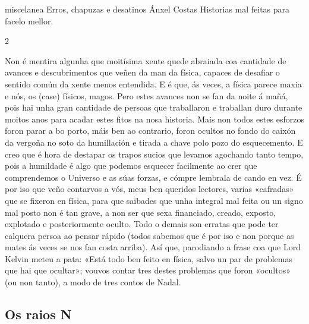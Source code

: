 \Artigo%
{miscelanea}%
{Erros, chapuzas e desatinos}%
{Ánxel Costas}%
{Historias mal feitas para facelo mellor.}

\begin{multicols}{2}

Non é mentira algunha que moitísima xente quede abraiada coa cantidade de  %
avances e descubrimentos que veñen da man da física, capaces de desafiar o
sentido común da xente menos entendida. E é que, ás veces, a física parece
maxia e nós, os (case) físicos, magos. Pero estes avances non se fan da noite á
mañá, pois hai unha gran cantidade de persoas que traballaron e traballan duro
durante moitos anos para acadar estes fitos na nosa historia. Mais non todos
estes esforzos foron parar a bo porto, máis ben ao contrario, foron ocultos no
fondo do caixón da vergoña no soto da humillación e tirada a chave polo pozo do
esquecemento. E creo que é hora de destapar os trapos sucios que levamos
agochando tanto tempo, pois a humildade é algo que podemos esquecer facilmente
ao crer que comprendemos o Universo e as súas forzas, e cómpre lembrala de
cando en vez. É por iso que veño contarvos a vós, meus ben queridos lectores,
varias «cafradas» que se fixeron en física, para que saibades que unha
integral mal feita ou un signo mal posto non é tan grave, a non ser que sexa
financiado, creado, exposto, explotado e posteriormente oculto. Todo o demais
son erratas que pode ter calquera persoa ao pensar rápido (todos sabemos que é
por iso e non porque as mates ás veces se nos fan costa arriba). Así que, %
parodiando a frase coa que Lord Kelvin meteu a pata: «Está todo ben feito en
física, salvo un par de problemas que hai que ocultar»; vouvos contar tres
destes problemas que foron «ocultos» (ou non tanto), a modo de tres contos de
Nadal.

\subsection*{Os raios N}


\end{multicols}
